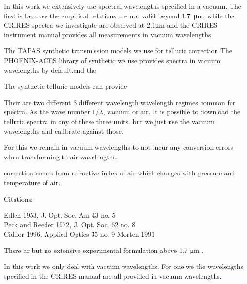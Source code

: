 In this work we extensively use spectral wavelengths specified in a vacuum. The first is because the empirical relations are not valid beyond 1.7\ \si{\micro\meter}, while the CRIRES spectra we investigate are observed at 2.1\si{\micro\meter} and the CRIRES instrument manual  provides all measurements in vacuum wavelengths.

The TAPAS synthetic transmission models  \citet{bertaux_tapas_2014} we use for telluric correction
The PHOENIX-ACES library of synthetic we use provides spectra in vacuum wavelengths by default.and the

The synthetic telluric models can provide 

Their are two different 3 different wavelength wavelength regimes common for spectra. As the wave number $1/\lambda$, vacuum or air. It is possible to download the telluric spectra in any of these three units. but we just use the vacuum wavelengths and calibrate against those.

For this we remain in vacuum wavelengths to not incur any conversion errors when transforming to air wavelengths.

correction comes from refractive index of air which changes with pressure and temperature of air.




Citations:

Edlen 1953, J. Opt. Soc. Am 43 no. 5\\
Peck and Reeder 1972, J. Opt. Soc. 62 no. 8\\
Ciddor 1996, Applied Optics 35 no. 9
Morten 1991



There ar but no extensive experimental formulation above 1.7 \si{\micro\meter} \citet{ciddor}.

In this work we only deal with vacuum wavelengths. For one we the wavelengths specified in the CRIRES manual are all provided in vacuum wavelengths.
